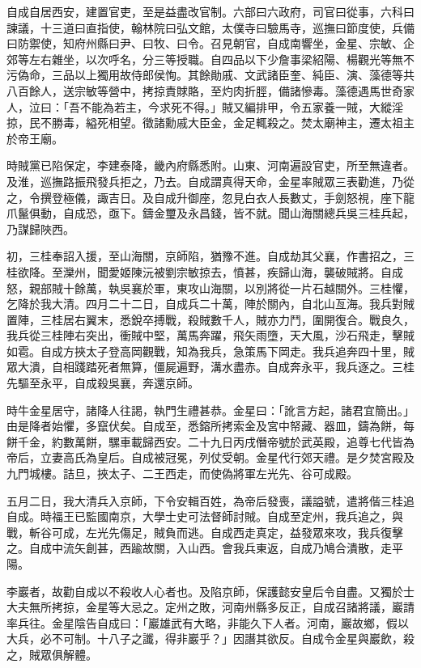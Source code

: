 \begin{pinyinscope}
自成自居西安，建置官吏，至是益盡改官制。六部曰六政府，司官曰從事，六科曰諫議，十三道曰直指使，翰林院曰弘文館，太僕寺曰驗馬寺，巡撫曰節度使，兵備曰防禦使，知府州縣曰尹、曰牧、曰令。召見朝官，自成南響坐，金星、宗敏、企郊等左右雜坐，以次呼名，分三等授職。自四品以下少詹事梁紹陽、楊觀光等無不污偽命，三品以上獨用故侍郎侯恂。其餘勛戚、文武諸臣奎、純臣、演、藻德等共八百餘人，送宗敏等營中，拷掠責賕賂，至灼肉折脛，備諸慘毒。藻德遇馬世奇家人，泣曰：「吾不能為若主，今求死不得。」賊又編排甲，令五家養一賊，大縱淫掠，民不勝毒，縊死相望。徵諸勳戚大臣金，金足輒殺之。焚太廟神主，遷太祖主於帝王廟。

時賊黨已陷保定，李建泰降，畿內府縣悉附。山東、河南遍設官吏，所至無違者。及淮，巡撫路振飛發兵拒之，乃去。自成謂真得天命，金星率賊眾三表勸進，乃從之，令撰登極儀，諏吉日。及自成升御座，忽見白衣人長數丈，手劍怒視，座下龍爪鬣俱動，自成恐，亟下。鑄金璽及永昌錢，皆不就。聞山海關總兵吳三桂兵起，乃謀歸陜西。

初，三桂奉詔入援，至山海關，京師陷，猶豫不進。自成劫其父襄，作書招之，三桂欲降。至灤州，聞愛姬陳沅被劉宗敏掠去，憤甚，疾歸山海，襲破賊將。自成怒，親部賊十餘萬，執吳襄於軍，東攻山海關，以別將從一片石越關外。三桂懼，乞降於我大清。四月二十二日，自成兵二十萬，陣於關內，自北山亙海。我兵對賊置陣，三桂居右翼末，悉銳卒搏戰，殺賊數千人，賊亦力鬥，圍開復合。戰良久，我兵從三桂陣右突出，衝賊中堅，萬馬奔躍，飛矢雨墮，天大風，沙石飛走，擊賊如雹。自成方挾太子登高岡觀戰，知為我兵，急策馬下岡走。我兵追奔四十里，賊眾大潰，自相踐踏死者無算，僵屍遍野，溝水盡赤。自成奔永平，我兵逐之。三桂先驅至永平，自成殺吳襄，奔還京師。

時牛金星居守，諸降人往謁，執門生禮甚恭。金星曰：「訛言方起，諸君宜簡出。」由是降者始懼，多竄伏矣。自成至，悉鎔所拷索金及宮中帑藏、器皿，鑄為餅，每餅千金，約數萬餅，騾車載歸西安。二十九日丙戌僭帝號於武英殿，追尊七代皆為帝后，立妻高氏為皇后。自成被冠冕，列仗受朝。金星代行郊天禮。是夕焚宮殿及九門城樓。詰旦，挾太子、二王西走，而使偽將軍左光先、谷可成殿。

五月二日，我大清兵入京師，下令安輯百姓，為帝后發喪，議謚號，遣將偕三桂追自成。時福王已監國南京，大學士史可法督師討賊。自成至定州，我兵追之，與戰，斬谷可成，左光先傷足，賊負而逃。自成西走真定，益發眾來攻，我兵復擊之。自成中流矢創甚，西踰故關，入山西。會我兵東返，自成乃鳩合潰散，走平陽。

李巖者，故勸自成以不殺收人心者也。及陷京師，保護懿安皇后令自盡。又獨於士大夫無所拷掠，金星等大忌之。定州之敗，河南州縣多反正，自成召諸將議，巖請率兵往。金星陰告自成曰：「巖雄武有大略，非能久下人者。河南，巖故鄉，假以大兵，必不可制。十八子之讖，得非巖乎？」因譖其欲反。自成令金星與巖飲，殺之，賊眾俱解體。


\end{pinyinscope}
